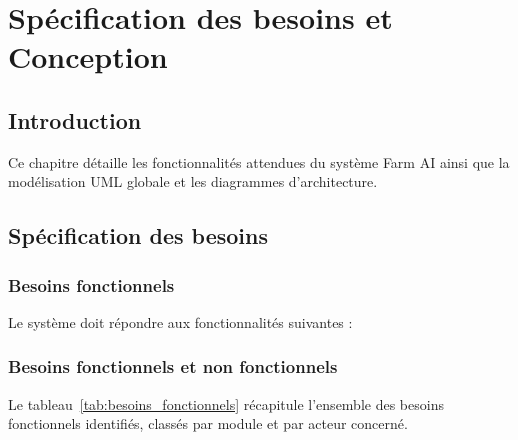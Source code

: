 \documentclass[12pt,a4paper]{report}
\numberwithin{figure}{chapter}
\numberwithin{table}{chapter}
\begin{document}
\chapter{Spécification des besoins et Conception}

\section{Introduction}
Ce chapitre détaille les fonctionnalités attendues du système Farm AI ainsi que la modélisation
UML globale et les diagrammes d'architecture.

\section{Spécification des besoins}

\subsection{Besoins fonctionnels}
Le système doit répondre aux fonctionnalités suivantes :

\subsection{Besoins fonctionnels et non fonctionnels}

Le tableau~\ref{tab:besoins_fonctionnels} récapitule l'ensemble des besoins fonctionnels
identifiés, classés par module et par acteur concerné.
\end{document}

